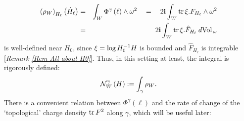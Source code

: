 \documentclass{article}
\newcommand{\func}[1]{\textnormal {#1\,}}
\newcommand{\dvol}{\:d\func{Vol}_\omega}
\begin{document}
\begin{eqnarray*}
        \left( \rho _{W}\right) _{H_{\ell }}\left( \dot{H}_{\ell }\right)
        &=&\int_{W}\Phi ^{\gamma }\left( \ell \right) \wedge \omega ^{2}
        \quad= \quad2\mathbf{i}\int_{W}\func{tr}\xi.F_{H_\ell}\wedge\omega^{2}\\
        &=&2\mathbf{i}\int_{W}\func{tr}\xi.\hat{F}_{H_\ell}\dvol
\end{eqnarray*}%
is well-defined near $H_0$, since $\xi=\func{log}H_0^{-1}H$ is bounded and $\hat{F}_{H_{\ell }}$ is integrable [\emph{Remark \ref{Rem All about H0}}]. Thus, in this setting at least, the integral is rigorously defined:%
\begin{equation}        \label{Eq func N first def}
                        \index{norm!functional!$\mathcal{N}_{W}$}
        \mathcal{N}_{W}^{\gamma}\left( H\right):=\int_{\gamma }\rho _{W}.
\end{equation}%
There is a convenient relation between $\Phi ^{\gamma }\left( \ell \right) $ and the rate of change of the `topological' charge density $\func{tr}F^2$ along $\gamma$, which will be useful later:
\end{document}
